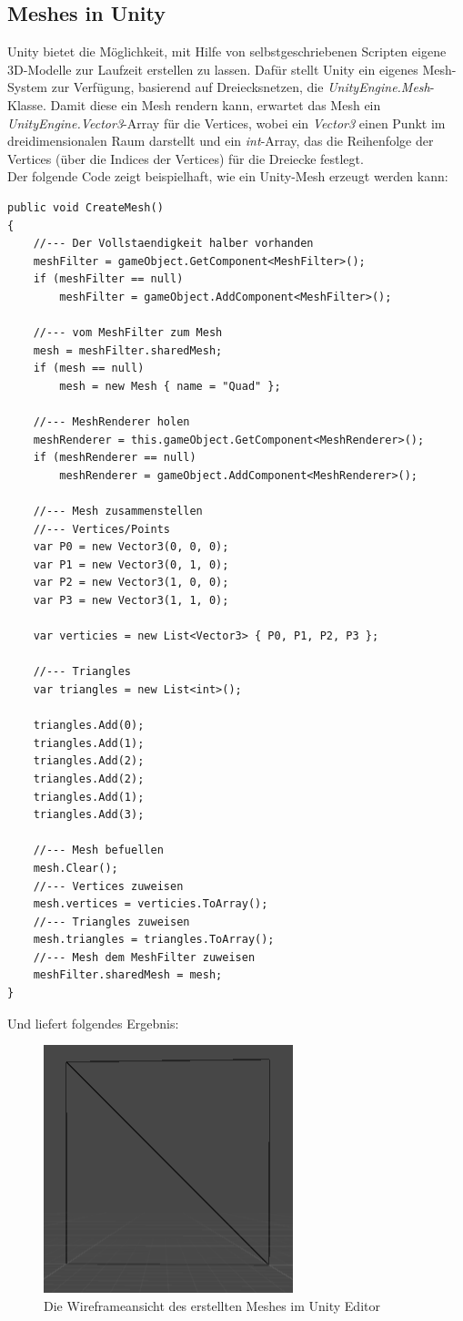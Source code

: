 \subsection{Meshes in Unity}
Unity bietet die M\"oglichkeit, mit Hilfe von selbstgeschriebenen Scripten eigene 3D-Modelle zur Laufzeit erstellen zu lassen. Daf\"ur stellt Unity ein eigenes Mesh-System zur Verf\"ugung, basierend auf Dreiecksnetzen, die \textit{UnityEngine.Mesh}-Klasse. Damit diese ein Mesh rendern kann, erwartet das Mesh ein \textit{UnityEngine.Vector3}-Array f\"ur die Vertices, wobei ein \textit{Vector3} einen Punkt im dreidimensionalen Raum darstellt und ein \textit{int}-Array, das die Reihenfolge der Vertices (\"uber die Indices der Vertices) f\"ur die Dreiecke festlegt.   
\\
Der folgende Code zeigt beispielhaft, wie ein Unity-Mesh erzeugt werden kann:
\begin{lstlisting}
public void CreateMesh()
{
	//--- Der Vollstaendigkeit halber vorhanden
	meshFilter = gameObject.GetComponent<MeshFilter>();
	if (meshFilter == null)
		meshFilter = gameObject.AddComponent<MeshFilter>();

	//--- vom MeshFilter zum Mesh
	mesh = meshFilter.sharedMesh;
	if (mesh == null)
		mesh = new Mesh { name = "Quad" };

	//--- MeshRenderer holen
	meshRenderer = this.gameObject.GetComponent<MeshRenderer>();
	if (meshRenderer == null)
		meshRenderer = gameObject.AddComponent<MeshRenderer>();

	//--- Mesh zusammenstellen
	//--- Vertices/Points
	var P0 = new Vector3(0, 0, 0);
	var P1 = new Vector3(0, 1, 0);
	var P2 = new Vector3(1, 0, 0);
	var P3 = new Vector3(1, 1, 0);
	
	var verticies = new List<Vector3> { P0, P1, P2, P3 };

	//--- Triangles
	var triangles = new List<int>();

	triangles.Add(0);
	triangles.Add(1);
	triangles.Add(2);
	triangles.Add(2);
	triangles.Add(1);
	triangles.Add(3);

	//--- Mesh befuellen
	mesh.Clear();
	//--- Vertices zuweisen
	mesh.vertices = verticies.ToArray();
	//--- Triangles zuweisen
	mesh.triangles = triangles.ToArray();
	//--- Mesh dem MeshFilter zuweisen
	meshFilter.sharedMesh = mesh;
}
\end{lstlisting}

Und liefert folgendes Ergebnis:
\begin{figure}[h]
	\centering
	\includegraphics[width=0.35\linewidth]{Images/UnityQuadWireframe}
	\caption[Die Wireframeansicht des erstellten Meshes]{Die Wireframeansicht des erstellten Meshes im Unity Editor}
	\label{fig:unityquadwireframe}
\end{figure}


